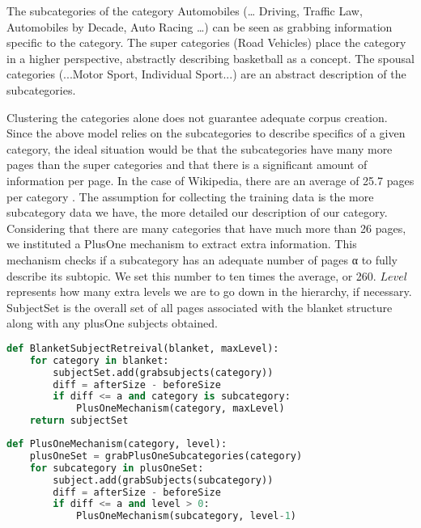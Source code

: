 The subcategories of the category Automobiles (… Driving, Traffic Law,
Automobiles by Decade, Auto Racing …) can be seen as grabbing
information specific to the category. The super categories (Road
Vehicles) place the category in a higher perspective, abstractly
describing basketball as a concept. The spousal categories
(...Motor Sport, Individual Sport...) are an abstract description of
the subcategories.


Clustering the categories alone does not guarantee adequate corpus
creation. Since the above model relies on the subcategories to
describe specifics of a given category, the ideal situation would be
that the subcategories have many more pages than the super categories
and that there is a significant amount of information per page.  In
the case of Wikipedia, there are an average of 25.7 pages per category
\cite{1321474}. The assumption for collecting the training data is the
more subcategory data we have, the more detailed our description of
our category. Considering that there are many categories that have
much more than 26 pages, we instituted a PlusOne mechanism to extract
extra information. This mechanism checks if a subcategory has an
adequate number of pages α to fully describe its subtopic. We set this
number to ten times the average, or 260. $Level$ represents how many
extra levels we are to go down in the hierarchy, if
necessary. SubjectSet is the overall set of all pages associated with
the blanket structure along with any plusOne subjects obtained.

\begin{lstlisting}[language=Python, frame=none, tabsize=2, caption=BlanketSubjectRetreival, label=BlanketSubjectRetreival, basicstyle=\small]
def BlanketSubjectRetreival(blanket, maxLevel):
	for category in blanket:
		subjectSet.add(grabsubjects(category))
		diff = afterSize - beforeSize
		if diff <= a and category is subcategory:
			PlusOneMechanism(category, maxLevel)
	return subjectSet
\end{lstlisting}

\begin{lstlisting}[language=Python, frame=none, tabsize=2, caption=PlusOneMechanism, label=PlusOneMechanism, basicstyle=\small]
def PlusOneMechanism(category, level):
	plusOneSet = grabPlusOneSubcategories(category)
	for subcategory in plusOneSet:
		subject.add(grabSubjects(subcategory))
		diff = afterSize - beforeSize
		if diff <= a and level > 0:
			PlusOneMechanism(subcategory, level-1)


\end{lstlisting}



